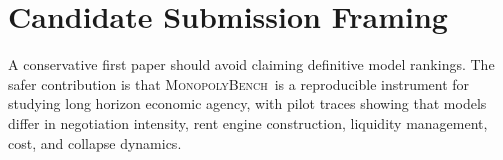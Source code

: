 \documentclass[conference]{IEEEtran}
\newcommand{\Bench}{\textsc{MonopolyBench}}
\begin{document}
\section{Candidate Submission Framing}

A conservative first paper should avoid claiming definitive model rankings. The safer contribution is that \Bench\ is a reproducible instrument for studying long horizon economic agency, with pilot traces showing that models differ in negotiation intensity, rent engine construction, liquidity management, cost, and collapse dynamics.
\end{document}
